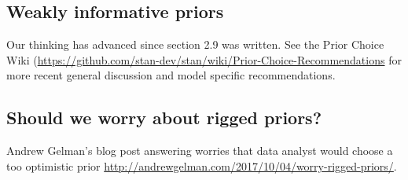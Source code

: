 \documentclass[a4paper,11pt,english]{article}
\begin{document}
\subsection*{Weakly informative priors}

Our thinking has advanced since section 2.9 was written. See the Prior
Choice Wiki
(\url{https://github.com/stan-dev/stan/wiki/Prior-Choice-Recommendations}
for more recent general discussion and model specific recommendations.

\subsection*{Should we worry about rigged priors?}

Andrew Gelman's blog post answering worries that data analyst would
choose a too optimistic prior
\url{http://andrewgelman.com/2017/10/04/worry-rigged-priors/}.
\end{document}
